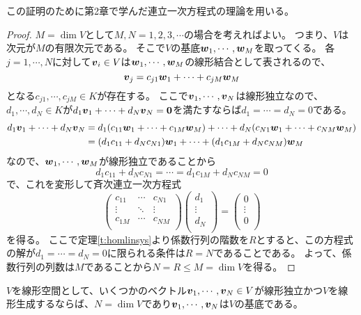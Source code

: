 この証明のために第2章で学んだ連立一次方程式の理論を用いる。

\begin{proof}
$M = \dim V$として$M, N = 1, 2, 3, \cdots$の場合を考えればよい。
つまり、$V$は次元が$M$の有限次元である。
そこで$V$の基底$\vb*{w}_1, \cdots, \vb*{w}_M$を取ってくる。
各$j = 1, \cdots, N$に対して$\vb*{v}_i \in V$は$\vb*{w}_1, \cdots, \vb*{w}_M$の線形結合として表されるので、
$$
\vb*{v}_j = c_{j 1}\vb*{w}_1+\cdots+c_{j M}\vb*{w}_M
$$
となる$c_{j 1}, \cdots, c_{j M} \in K$が存在する。
ここで$\vb*{v}_1, \cdots, \vb*{v}_N$は線形独立なので、$d_1, \cdots, d_N \in K$が$d_1\vb*{v}_1+\cdots+d_N\vb*{v}_N = \vb*{0}$を満たすならば$d_1 = \cdots = d_N = 0$である。
$$
\begin{aligned}
d_1\vb*{v}_1+\cdots+d_N\vb*{v}_N
&= d_1(c_{1 1}\vb*{w}_1+\cdots+c_{1 M}\vb*{w}_M)+\cdots+d_N(c_{N 1}\vb*{w}_1+\cdots+c_{N M}\vb*{w}_M) \\
&= (d_1 c_{1 1}+ d_N c_{N 1})\vb*{w}_1+\cdots+(d_1 c_{1 M}+ d_N c_{N M})\vb*{w}_M
\end{aligned}
$$
なので、$\vb*{w}_1, \cdots, \vb*{w}_M$が線形独立であることから
$$
d_1 c_{1 1}+ d_N c_{N 1} = \cdots = d_1 c_{1 M}+ d_N c_{N M} = 0
$$
で、これを変形して斉次連立一次方程式
$$
\begin{pmatrix}
c_{1 1} & \cdots & c_{N 1} \\
\vdots & \ddots & \vdots \\
c_{1 M} & \cdots & c_{N M} \\
\end{pmatrix}
\begin{pmatrix}
d_1 \\
\vdots \\
d_N \\
\end{pmatrix}
=
\begin{pmatrix}
0 \\
\vdots \\
0 \\
\end{pmatrix}
$$
を得る。
ここで定理\ref{t:homlinsys}より係数行列の階数を$R$とすると、この方程式の解が$d_1 = \cdots = d_N = 0$に限られる条件は$R = N$であることである。
よって、係数行列の列数は$M$であることから$N = R \le M = \dim V$を得る。
\end{proof}

\begin{proposition}
$V$を線形空間として、いくつかのベクトル$\vb*{v}_1, \cdots, \vb*{v}_N \in V$が線形独立かつ$V$を線形生成するならば、$N = \dim V$であり$\vb*{v}_1, \cdots, \vb*{v}_N$は$V$の基底である。
\end{proposition}

